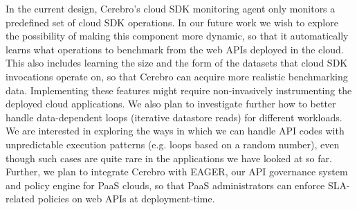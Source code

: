 
In the current design, Cerebro's cloud SDK monitoring agent only monitors 
a predefined set of cloud SDK operations. In our future work we wish 
to explore the possibility of making this component more dynamic,
so that it automatically learns what operations to benchmark from the web APIs 
deployed in the cloud. This also includes learning the size and the form of the datasets
that cloud SDK invocations operate on, so that Cerebro can acquire more realistic
benchmarking data. Implementing these features might require non-invasively
instrumenting the deployed cloud applications. We also plan to investigate further how to better
handle data-dependent loops (iterative datastore reads) for different workloads. We are interested
in exploring the ways in which we can handle API codes with unpredictable execution patterns (e.g.
loops based on a random number), even though such cases are quite rare in the applications we
have looked at so far.
Further, we plan
to integrate Cerebro with EAGER, our API governance system 
and policy engine for PaaS clouds, so 
that PaaS administrators can enforce SLA-related policies on web APIs at deployment-time.
